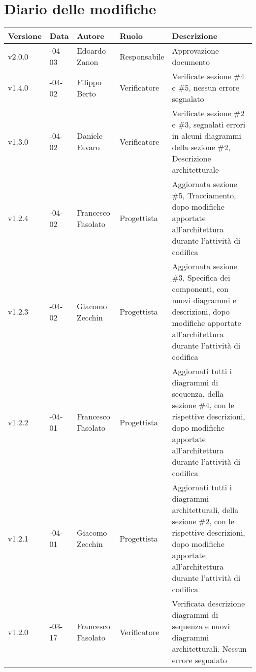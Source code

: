 \vspace*{-10mm}
\section*{Diario delle modifiche}
	
\begin{longtable} { >{\centering}p{1.4cm} >{\centering}p{2cm} >{\centering}p{2.3cm} >{\centering}p{2.7cm} p{5.5cm} }
	\toprule
	\textbf{Versione} & \textbf{Data} & \textbf{Autore} & \textbf{Ruolo} & \centerline{\textbf{Descrizione}} \\
	\midrule
	\arrayrulecolor{gray}
	v2.0.0 & 2017-04-03 &  Edoardo Zanon & Responsabile & Approvazione documento \\
	\addlinespace[0.4em]
	\midrule
	\addlinespace[0.4em]
	v1.4.0 & 2017-04-02 & Filippo Berto & Verificatore & Verificate sezione \#4 e \#5, nessun errore segnalato \\
	\addlinespace[0.4em]
	\midrule
	\addlinespace[0.4em]
	v1.3.0 & 2017-04-02 & Daniele Favaro & Verificatore & Verificate sezione \#2 e \#3, segnalati errori in alcuni diagrammi della sezione \#2, Descrizione architetturale \\
	\addlinespace[0.4em]
	\midrule
	\addlinespace[0.4em]
	v1.2.4 & 2017-04-02 & Francesco Fasolato & Progettista & Aggiornata sezione \#5, Tracciamento, dopo modifiche apportate all'architettura durante l'attività di codifica \\
	\addlinespace[0.4em]
	\midrule
	\addlinespace[0.4em]
	v1.2.3 & 2017-04-02 &  Giacomo Zecchin  & Progettista & Aggiornata sezione \#3, Specifica dei componenti, con nuovi diagrammi e descrizioni, dopo modifiche apportate all'architettura durante l'attività di codifica \\
	\addlinespace[0.4em]
	\midrule
	\addlinespace[0.4em]
	v1.2.2 & 2017-04-01 & Francesco Fasolato & Progettista & Aggiornati tutti i diagrammi di sequenza, della sezione \#4, con le rispettive descrizioni, dopo modifiche apportate all'architettura durante l'attività di codifica \\
	\addlinespace[0.4em]
	\midrule
	\addlinespace[0.4em]
	v1.2.1 & 2017-04-01 & Giacomo Zecchin & Progettista & Aggiornati tutti i diagrammi architetturali, della sezione \#2, con le rispettive descrizioni, dopo modifiche apportate all'architettura durante l'attività di codifica \\
	\addlinespace[0.4em]
	\midrule
	\addlinespace[0.4em]
	v1.2.0 & 2017-03-17 &  Francesco Fasolato & Verificatore & Verificata descrizione diagrammi di sequenza e nuovi diagrammi architetturali. Nessun errore segnalato \\

\end{longtable}
